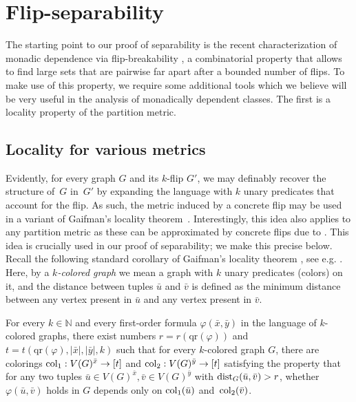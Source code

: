 \documentclass[a4paper,UKenglish,cleveref, autoref, thm-restate]{lipics-v2021}
\newcommand{\qr}{\mathrm{qr}}
\newcommand{\N}[0]{\mathrm{\mathbb{N}}}
\newcommand{\col}{\textnormal{col}}
\newcommand{\dist}{\textnormal{dist}}
\renewcommand{\phi}{\varphi}
\begin{document}
 
\section{Flip-separability}\label{sec:flip-separability}

The starting point to our proof of separability is the recent characterization of monadic dependence via flip-breakability \cite{flip-breakability}, a combinatorial property that allows to find large sets that are pairwise far apart after a bounded number of flips. To make use of this property, we require some additional tools which we believe will be very useful in the analysis of monadically dependent classes. The first is a locality property of the partition metric.

\subsection{Locality for various metrics}
\label{sec:locality}



Evidently, for every graph $G$ and its $k$-flip $G'$, we may definably recover the structure of~$G$ in~$G'$ by expanding the language with $k$ unary predicates that account for the flip. As such, the metric induced by a concrete flip may be used in a variant of Gaifman's locality theorem~\cite{gaifman}. Interestingly, this idea also applies to any partition metric as these can be approximated by concrete flips due to . This idea is crucially used in our proof of separability; we make this precise below.
Recall the following standard corollary of Gaifman's locality theorem \cite{gaifman}, see e.g. \cite{boundedLocalCliquewidth}. Here, by a {\em{$k$-colored graph}} we mean a graph with $k$ unary predicates (colors) on it, and the distance between tuples $\bar u$ and $\bar v$ is defined as the minimum distance between any vertex present in $\bar u$ and any vertex present in $\bar v$.

\begin{theorem}
  \label{thm:gaifman-std}
  For every $k \in \N$ and every first-order formula $\phi(\bar x, \bar y)$ in the language of $k$-colored graphs,
  there exist numbers $r = r(\qr(\phi))$ and $t = t(\qr(\phi),|\bar x|,|\bar y|, k)$ such that for every $k$-colored graph $G$,
  there are colorings $\col_1:V(G)^{\bar x}\to [t]$ and $\col_2:V(G)^{\bar y}\to [t]$ satisfying the property that for any two tuples $\bar u \in V(G)^{\bar x}, \bar v \in V(G)^{\bar y}$ with $\dist_G(\bar u, \bar v) > r$, whether $\phi(\bar u, \bar v)$ holds in $G$ depends only on $\col_1(\bar u)$ and~$\col_2(\bar v)$.
\end{theorem}
\end{document}
